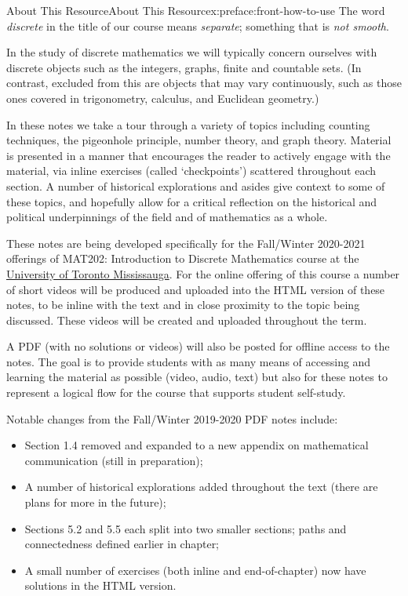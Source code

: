 \documentclass[oneside,10pt,]{book}
\numberwithin{equation}{section}
\begin{document}
%
%
\typeout{************************************************}
\typeout{************************************************}
%
\begin{preface}{About This Resource}{}{About This Resource}{}{}{x:preface:front-how-to-use}
The word \emph{discrete} in the title of our course means \emph{separate}; something that is \emph{not smooth}.%
\par
In the study of discrete mathematics we will typically concern ourselves with discrete objects such as the integers, graphs, finite and countable sets. (In contrast, excluded from this are objects that may vary continuously, such as those ones covered in trigonometry, calculus, and Euclidean geometry.)%
\par
In these notes we take a tour through a variety of topics including counting techniques, the pigeonhole principle, number theory, and graph theory. Material is presented in a manner that encourages the reader to actively engage with the material, via inline exercises (called `checkpoints') scattered throughout each section. A number of historical explorations and asides give context to some of these topics, and hopefully allow for a critical reflection on the historical and political underpinnings of the field and of mathematics as a whole.%
\par
These notes are being developed specifically for the Fall\slash{}Winter 2020-2021 offerings of MAT202: Introduction to Discrete Mathematics course at the \href{https://www.utm.utoronto.ca/math-cs-stats/home}{University of Toronto Mississauga}. For the online offering of this course a number of short videos will be produced and uploaded into the HTML version of these notes, to be inline with the text and in close proximity to the topic being discussed. These videos will be created and uploaded throughout the term.%
\par
A PDF (with no solutions or videos) will also be posted for offline access to the notes. The goal is to provide students with as many means of accessing and learning the material as possible (video, audio, text) but also for these notes to represent a logical flow for the course that supports student self-study.%
\par
Notable changes from the Fall\slash{}Winter 2019-2020 PDF notes include:%
\begin{itemize}[label=\textbullet]
\item{}Section 1.4 removed and expanded to a new appendix on mathematical communication (still in preparation);%
\item{}A number of historical explorations added throughout the text (there are plans for more in the future);%
\item{}Sections 5.2 and 5.5 each split into two smaller sections; paths and connectedness defined earlier in chapter;%
\item{}A small number of exercises (both inline and end-of-chapter) now have solutions in the HTML version.%
\end{itemize}
%
\end{preface}
\end{document}
